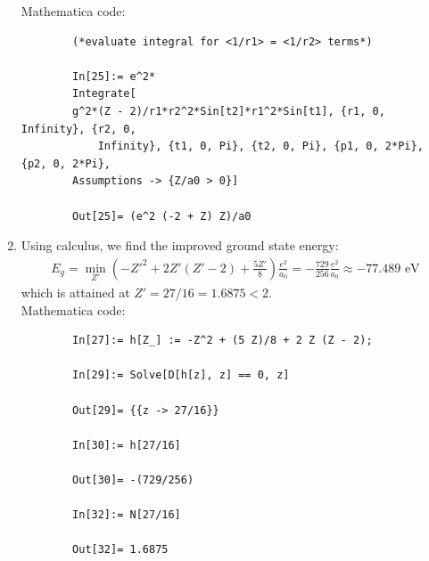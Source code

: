 \documentclass{book}
\theoremstyle{definition}
\newcommand{\ham}{\mathcal{H}}
\newcommand{\f}[2]{\frac{#1}{#2}}
\newcommand{\lp}{\left(}
\newcommand{\rp}{\right)}
\begin{document}
\begin{enumerate}[label=(\alph*)]
	
	Mathematica code:
	\begin{lstlisting}
		(*evaluate integral for <1/r1> = <1/r2> terms*)
		
		In[25]:= e^2*
		Integrate[
		g^2*(Z - 2)/r1*r2^2*Sin[t2]*r1^2*Sin[t1], {r1, 0, Infinity}, {r2, 0,
			Infinity}, {t1, 0, Pi}, {t2, 0, Pi}, {p1, 0, 2*Pi}, {p2, 0, 2*Pi},
		Assumptions -> {Z/a0 > 0}]
		
		Out[25]= (e^2 (-2 + Z) Z)/a0
	\end{lstlisting}
	
	
	\item Using calculus, we find the improved ground state energy:
	\begin{align*}
		E_g = \min_{Z'} \lp -Z'^2 +2Z'(Z'-2) + \f{5 Z'}{8} \rp \f{e^2}{a_0} = -\f{729}{256}\f{e^2}{a_0} \approx \boxed{-77.489 \text{ eV}}
	\end{align*}
	which is attained at $Z' = 27/16 = 1.6875 < 2$.\\
	
	Mathematica code:
	\begin{lstlisting}
		In[27]:= h[Z_] := -Z^2 + (5 Z)/8 + 2 Z (Z - 2);
		
		In[29]:= Solve[D[h[z], z] == 0, z]
		
		Out[29]= {{z -> 27/16}}
		
		In[30]:= h[27/16]
		
		Out[30]= -(729/256)
		
		In[32]:= N[27/16]
		
		Out[32]= 1.6875
	\end{lstlisting}
	
	
\end{enumerate}
\end{document}
